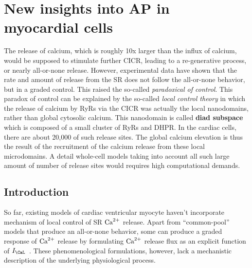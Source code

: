  
\chapter{New insights into AP in myocardial cells}
\label{chap:ap_ventricular_myocyte_localcontrol}

The release of calcium, which is roughly 10x larger than the influx of
calcium, would be supposed to stimulate further CICR, leading to a
re-generative process, or nearly all-or-none release. However,
experimental data have shown that the rate and amount of release from
the SR does not follow the all-or-none behavior, but in a graded
control. This raised the so-called {\it paradoxical of control}. This
paradox of control can be explained by the so-called
{\it local control theory} in which the release of calcium by RyRs via
the CICR was actually the local nanodomains, rather than global
cytosolic calcium. This nanodomain is called {\bf diad subspace} which
is composed of a small cluster of RyRs and DHPR. In the cardiac cells,
there are about 20,000 of such release sites. The global calcium
elevation is thus the result of the recruitment of the calcium release
from these local microdomains. A detail whole-cell models taking into
account all such large amount of number of release sites would
requires high computational demands. 
 


\section{Introduction}
\label{sec:introduction-11}

So far, existing models of cardiac ventricular myocyte haven't
incorporate mechanism of local control of SR ${\text{Ca}^{2+}}$ release. Apart from
``common-pool'' models that produce an all-or-none behavior, some can
produce a graded response of ${\text{Ca}^{2+}}$ release by formulating ${\text{Ca}^{2+}}$
release flux as an explicit function of
$I_\CaL$~\citep{luo1994dmc_b,priebe1998,faber2000,fox2002}. These
phenomenological formulations, however, lack a mechanistic description
of the underlying physiological process. 

